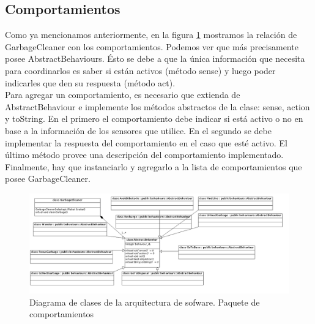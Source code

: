\subsection{Comportamientos}
Como ya mencionamos anteriormente, en la figura \ref{fig:soft_arq_behaviours} mostramos la
relaci\'on de GarbageCleaner con los comportamientos. Podemos ver que m\'as precisamente posee
AbstractBehaviours. \'Esto se debe a que la \'unica informaci\'on que necesita para coordinarlos
es saber si est\'an activos (m\'etodo sense) y luego poder indicarles que den su respuesta
(m\'etodo act).
\\\indent
Para agregar un comportamiento, es necesario que extienda de AbstractBehaviour e implemente
los m\'etodos abstractos de la clase: sense, action y toString. En el primero el comportamiento
debe indicar si est\'a activo o no en base a la informaci\'on de los sensores que utilice. En el
segundo se debe implementar la respuesta del comportamiento en el caso que est\'e activo. El
\'ultimo m\'etodo provee una descripci\'on del comportamiento implementado. Finalmente, hay
que instanciarlo y agregarlo a la lista de comportamientos que posee GarbageCleaner.
\begin{landscape}
\begin{figure}[h]
	\centering
	\includegraphics[scale=0.52]{comportamientos/figures/api1.png}
	\caption[Arquitectura de software: comportamientos]{Diagrama de clases de la arquitectura
			de sofware. Paquete de comportamientos}
	\label{fig:soft_arq_behaviours}
\end{figure}
\end{landscape}


